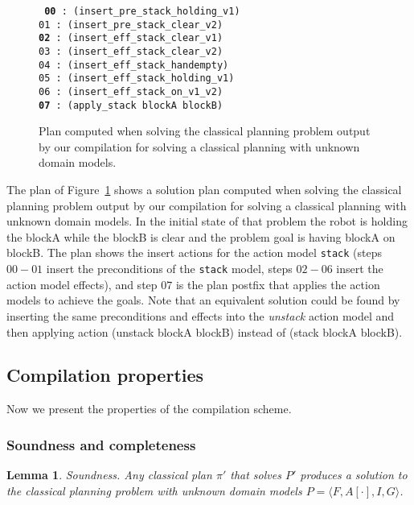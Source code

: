 \documentclass{article}
\newcommand{\tup}[1]{{\langle #1 \rangle}}
\newtheorem{mylemma}[mytheorem]{Lemma}
\begin{document}
\begin{figure}[hbt!]
	{\scriptsize\tt
		{\bf 00} : (insert\_pre\_stack\_holding\_v1) \\
		01 : (insert\_pre\_stack\_clear\_v2)\\
		{\bf 02} : (insert\_eff\_stack\_clear\_v1)\\
		03 : (insert\_eff\_stack\_clear\_v2)\\
		04 : (insert\_eff\_stack\_handempty)\\
		05 : (insert\_eff\_stack\_holding\_v1)\\
		06 : (insert\_eff\_stack\_on\_v1\_v2)\\
		{\bf 07} : (apply\_stack blockA blockB)\\
	}
	\caption{\small Plan computed when solving the classical planning problem output by our compilation for solving a classical planning with unknown domain models.}
	\label{fig:plan-lplan}
\end{figure}

The plan of Figure~\ref{fig:plan-lplan} shows a solution plan computed when solving the classical planning problem output by our compilation for solving a classical planning with unknown domain models. In the initial state of that problem the robot is holding the blockA while the blockB is clear and the problem goal is having blockA on blockB. The plan shows the insert actions for the action model {\tt\small stack} (steps $00-01$ insert the preconditions of the {\tt\small stack} model, steps $02-06$ insert the action model effects), and step $07$ is the plan postfix that applies the action models to achieve the goals. Note that an equivalent solution could be found by inserting the same preconditions and effects into the {\em unstack} action model and then applying action (unstack blockA blockB) instead of (stack blockA blockB).


\subsection{Compilation properties}
Now we present the properties of the compilation scheme.

\subsubsection{Soundness and completeness}

\begin{mylemma}
Soundness. Any classical plan $\pi'$ that solves $P'$ produces a solution to the classical planning problem with unknown domain models $P=\tup{F,A[\cdot],I,G}$.
\end{mylemma}
\end{document}
